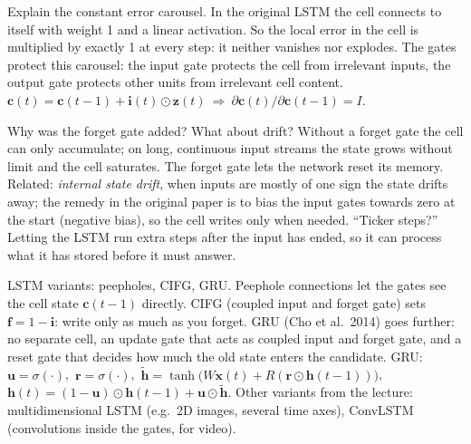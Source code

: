 \begin{qabox}[Hochreiter]{\cexam Explain the constant error carousel.}
\ans In the original LSTM the cell connects to itself with weight 1 and a linear activation. So
the local error in the cell is multiplied by exactly 1 at every step: it neither vanishes nor
explodes. The gates protect this carousel: the input gate protects the cell from irrelevant
inputs, the output gate protects other units from irrelevant cell content.
\formula $\mathbf{c}(t)=\mathbf{c}(t-1)+\mathbf{i}(t)\odot\mathbf{z}(t)\ \Rightarrow\
\partial\mathbf{c}(t)/\partial\mathbf{c}(t-1)=I$.
\end{qabox}

\begin{qabox}[Hochreiter]{\cexam Why was the forget gate added? What about drift?}
\ans Without a forget gate the cell can only accumulate; on long, continuous input streams the
state grows without limit and the cell saturates. The forget gate lets the network reset its
memory. Related: \emph{internal state drift}, when inputs are mostly of one sign the state drifts
away; the remedy in the original paper is to bias the input gates towards zero at the start
(negative bias), so the cell writes only when needed.
\follow ``Ticker steps?'' Letting the LSTM run extra steps after the input has ended, so it can
process what it has stored before it must answer.
\end{qabox}

\begin{qabox}[Hochreiter]{\cexam LSTM variants: peepholes, CIFG, GRU.}
\ans Peephole connections let the gates see the cell state $\mathbf{c}(t-1)$ directly.
CIFG (coupled input and forget gate) sets $\mathbf{f}=1-\mathbf{i}$: write only as much as you
forget. GRU (Cho et al.\ 2014) goes further: no separate cell, an update gate that acts as coupled
input and forget gate, and a reset gate that decides how much the old state enters the candidate.
\formula GRU:\ $\mathbf{u}=\sigma(\cdot)$,\ $\mathbf{r}=\sigma(\cdot)$,\
$\tilde{\mathbf{h}}=\tanh\bigl(W\mathbf{x}(t)+R(\mathbf{r}\odot\mathbf{h}(t-1))\bigr)$,\
$\mathbf{h}(t)=(1-\mathbf{u})\odot\mathbf{h}(t-1)+\mathbf{u}\odot\tilde{\mathbf{h}}$.
\follow Other variants from the lecture: multidimensional LSTM (e.g.\ 2D images, several time
axes), ConvLSTM (convolutions inside the gates, for video).
\end{qabox}

